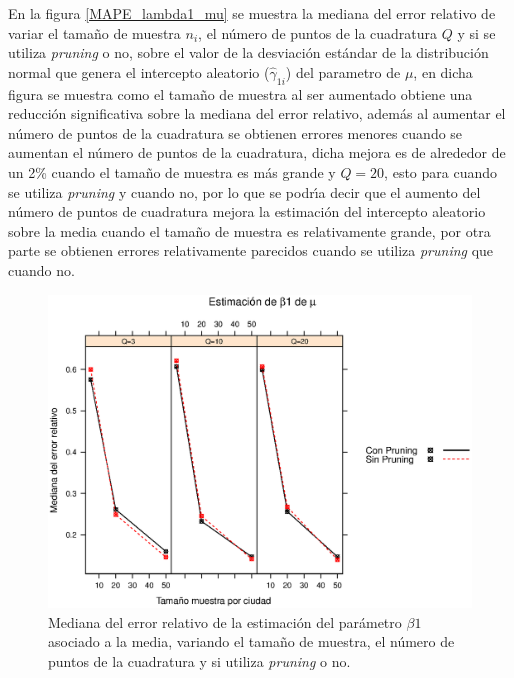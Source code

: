 En la figura \ref{MAPE_lambda1_mu} se muestra la mediana del error relativo de variar el tama\~{n}o de muestra $n_i$, el n\'{u}mero de puntos de la cuadratura $Q$ y si se utiliza \textit{pruning} o no, sobre el valor de la desviaci\'{o}n est\'{a}ndar de la distribuci\'{o}n normal que genera el intercepto aleatorio ($\hat{\gamma}_{1i}$) del parametro de $\mu$, en dicha figura se muestra como el tama\~{n}o de muestra al ser aumentado obtiene una reducci\'{o}n significativa sobre la mediana del error relativo, adem\'{a}s al aumentar el n\'{u}mero de puntos de la cuadratura se obtienen errores menores cuando se aumentan el n\'{u}mero de puntos de la cuadratura, dicha mejora es de alrededor de un 2\% cuando el tama\~{n}o de muestra es m\'{a}s grande y $Q=20$, esto para cuando se utiliza \textit{pruning} y cuando no, por lo que se podr\'{\i}a decir que el aumento del n\'{u}mero de puntos de cuadratura mejora la estimaci\'{o}n del intercepto aleatorio sobre la media cuando el tama\~{n}o de muestra es relativamente grande, por otra parte se obtienen errores relativamente parecidos cuando se utiliza \textit{pruning} que cuando no.\\


\begin{figure}
	\begin{center}
		\includegraphics[scale=0.6]{MAPE_beta1_mu.eps}	
		\caption{Mediana del error relativo de la estimaci\'{o}n del par\'{a}metro $\beta1$ asociado a la media, variando el tama\~{n}o de muestra, el n\'{u}mero de puntos de la cuadratura y si utiliza \textit{pruning} o no.}
		\label{MAPE_beta1_mu}
	\end{center}
\end{figure}

